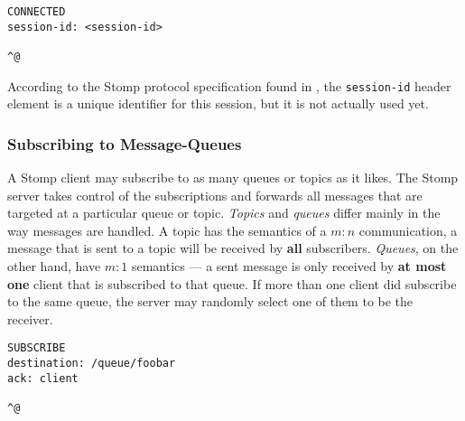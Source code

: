 \medskip
\begin{center}
  \begin{minipage}{.75\textwidth}
    \begin{lstlisting}[captionpos=b,backgroundcolor=\color{listingcolor},frame=lines,numbers=none,stepnumber=5,numberfirstline=false,numberstyle=\tiny,caption={The
        \texttt{CONNECTED} message sent by a Stomp server after a client
        has successfully logged in.},label={lst:stomp-connected}]
CONNECTED
session-id: <session-id>

^@
    \end{lstlisting}
  \end{minipage}
\end{center}

According to  the Stomp protocol specification found  in \cite{stomp}, the
\texttt{session-id}  header  element  is  a  unique  identifier  for  this
session, but it is not actually used yet.

\subsubsection{Subscribing to Message-Queues}

A Stomp client may subscribe to as  many queues or topics as it likes. The
Stomp server takes control of  the subscriptions and forwards all messages
that  are targeted  at  a  particular queue  or  topic. \emph{Topics}  and
\emph{queues} differ mainly  in the way messages are  handled. A topic has
the semantics  of a $m:n$ communication, \ie  a message that is  sent to a
topic will be received  by \textbf{all} subscribers. \emph{Queues}, on the
other hand,  have $m:1$ semantics ---  a sent message is  only received by
\textbf{at most one} client that is subscribed to that queue. If more than
one client did subscribe to the same queue, the server may randomly select
one of them to be the receiver.

\medskip
\begin{center}
  \begin{minipage}{.75\textwidth}
    \begin{lstlisting}[captionpos=b,backgroundcolor=\color{listingcolor},frame=lines,numbers=none,stepnumber=5,numberfirstline=false,numberstyle=\tiny,caption={The
        \texttt{SUBSCRIBE} frame used for queue or topic subscription.},label={lst:stomp-subscribe}]
SUBSCRIBE
destination: /queue/foobar
ack: client

^@
    \end{lstlisting}
  \end{minipage}
\end{center}

